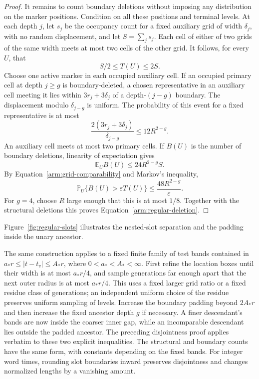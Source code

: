 \begin{proof}
It remains to count boundary deletions without imposing any distribution
on the marker positions.  Condition on all these positions and terminal
levels.  At each depth $j$, let $s_j$ be the occupancy count for a fixed
auxiliary grid of width $\delta_j$, with no random displacement, and
let $S=\sum_j s_j$.  Each cell of either of two grids of the same width
meets at most two cells of the other grid.  It follows, for every $U$,
that
\begin{equation}\label{arm:grid-comparability}
 S/2\leq T(U)\leq2S.
\end{equation}
Choose one active marker in each occupied auxiliary cell.  If an
occupied primary cell at depth $j\geq g$ is boundary-deleted, a chosen
representative in an auxiliary cell meeting it lies within
$3r_j+3\delta_j$ of a depth-$(j-g)$ boundary.  The displacement modulo
$\delta_{j-g}$ is uniform.  The probability of this event for a fixed
representative is at most
\[
 \frac{2(3r_j+3\delta_j)}{\delta_{j-g}}
 \leq12R^{2-g}.
\]
An auxiliary cell meets at most two primary cells.  If $B(U)$ is the
number of boundary deletions, linearity of expectation gives
\[
 \mathbb E_U B(U)\leq24R^{2-g}S.
\]
By Equation~\eqref{arm:grid-comparability} and Markov's inequality,
\begin{equation}\label{arm:boundary-probability}
 \mathbb P_U\{B(U)>\varepsilon T(U)\}
 \leq\frac{48R^{2-g}}{\varepsilon}.
\end{equation}
For $g=4$, choose $R$ large enough that this is at most $1/8$.
Together with the structural deletions this proves
Equation~\eqref{arm:regular-deletion}.
\end{proof}

Figure~\ref{fig:regular-slots} illustrates the nested-slot separation and
the padding inside the unary ancestor.


\begin{remark}\label{arm:other-test-bands}
The same construction applies to a fixed finite family of test bands
contained in $a_*r\leq |t-t_v|\leq A_*r$, where
$0<a_*<A_*<\infty$.  First refine the location boxes until their width
is at most $a_*r/4$, and sample generations far enough apart that the
next outer radius is at most $a_*r/4$.  This uses a fixed larger grid
ratio or a fixed residue class of generations; an independent uniform
choice of the residue preserves uniform sampling of levels.  Increase
the boundary padding beyond $2A_*r$ and then increase the fixed ancestor
depth $g$ if necessary.  A finer descendant's bands are now inside the
coarser inner gap, while an incomparable descendant lies outside the
padded ancestor.  The preceding disjointness proof applies verbatim to
these two explicit inequalities.  The structural and boundary counts
have the same form, with constants depending on the fixed bands.
For integer word times, rounding slot boundaries inward preserves
disjointness and changes normalized lengths by a vanishing amount.
\end{remark}


